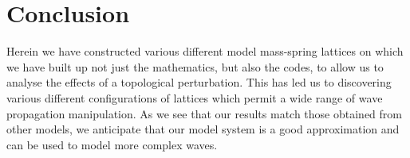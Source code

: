 \chapter{Conclusion}
Herein we have constructed various different model mass-spring lattices on
which we have built up not just the mathematics, but also the codes, to allow
us to analyse the effects of a topological perturbation. This has led us to
discovering various different configurations of lattices which permit a wide
range of wave propagation manipulation. As we see that our results match those
obtained from other models, we anticipate that our model system is a good
approximation and can be used to model more complex waves.
